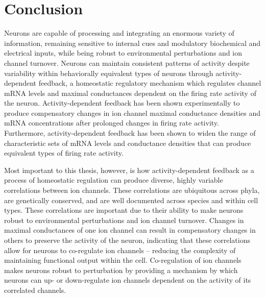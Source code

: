 \chapter{Conclusion}\label{ch:conclusion}

Neurons are capable of processing and integrating an enormous variety of information, remaining sensitive to internal cues and modulatory biochemical and electrical inputs, while being robust to environmental perturbations and ion channel turnover.
Neurons can maintain consistent patterns of activity despite variability within behaviorally equivalent types of neurons through activity-dependent feedback, a homeostatic regulatory mechanism which regulates channel mRNA levels and maximal conductances dependent on the firing rate activity of the neuron\cite{lemasson_activity-dependent_1993,liu_model_1998,stemmler_how_1999}. Activity-dependent feedback has been shown experimentally to produce compensatory changes in ion channel maximal conductance densities and mRNA concentrations after prolonged changes in firing rate activity. Furthermore, activity-dependent feedback has been shown to widen the range of characteristic sets of mRNA levels and conductance densities that can produce equivalent types of firing rate activity\cite{rodgers_dopaminergic_2013,goldman_global_2001}.

Most important to this thesis, however, is how activity-dependent feedback as a process of homeostatic regulation can produce diverse, highly variable correlations between ion channels\cite{schulz_variable_2006,schulz_quantitative_2007,golowasch_activity-dependent_1999}.  These correlations are ubiquitous across phyla, are genetically conserved, and are well documented across species and within cell types\cite{tran_ionic_2019,tobin_correlations_2009,schulz_quantitative_2007,santin_membrane_2019,maclean_activity-independent_2003}.
These correlations are important due to their ability to make neurons robust to environmental perturbations and ion channel turnover.
Changes in maximal conductances of one ion channel can result in compensatory changes in others to preserve the activity of the neuron, indicating that these correlations allow for neurons to co-regulate ion channels -- reducing the complexity of maintaining functional output within the cell.
Co-regulation of ion channels makes neurons robust to perturbation by providing a mechanism by which neurons can up- or down-regulate ion channels dependent on the activity of its correlated channels.

